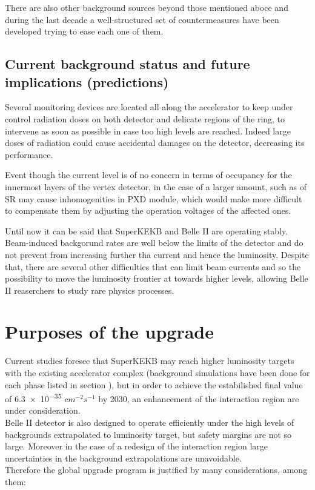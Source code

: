 There are also other  background sources beyond those mentioned aboce and during the last decade a well-structured set of countermeasures have been developed trying to ease each one of them.


\subsection{Current background status and future implications (predictions)}

Several monitoring devices are located all along the accelerator to keep under control radiation doses on both detector and delicate regions of the ring, to intervene as soon as possible in case too high levels are reached. Indeed large doses of radiation could cause accidental damages on the detector, decreasing its performance.

Event though the current level is of no concern in terms of occupancy for the innermost layers of the vertex detector, in the case of a larger amount, such as of SR may cause inhomogenities in PXD module, which would make more difficult to compensate them by adjusting the operation voltages of the affected ones.

Until now it can be said that SuperKEKB and Belle II are operating stably. Beam-induced backgorund rates are well below the limits of the detector and do not prevent from increasing further tha current and hence the luminosity.  
Despite that, there are several other difficulties that can limit beam currents and so the possibility to move the luminosity frontier at towards higher levels, allowing Belle II reaserchers to study rare physics processes. 



\section{Purposes of the upgrade}

Current studies foresee that SuperKEKB may reach higher luminosity targets with the existing accelerator complex (background simulations have been done for each phase listed in section ), but in order to achieve the estabilished final value of  \num{6.3e-35} $cm^{-2} s^{-1}$ by 2030, an enhancement of the interaction region are under consideration.\\

Belle II detector is also designed to operate efficiently under the high levels of backgrounds extrapolated to luminosity target, but safety margins are not so large. Moreover in the case of a redesign of the interaction region large uncertainties in the background extrapolations are unavoidable. \\
Therefore the global upgrade program is justified by many considerations, among them:

